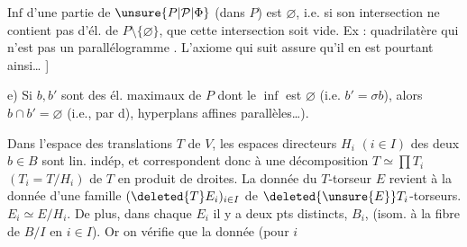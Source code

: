 $\mathrm{Inf}$ d'une partie de $\unsure{P|\mathcal P|\Phi}$ (dans $P$) est $\varnothing$, i.e. si son
intersection ne contient pas d'él. de $P\setminus\{\varnothing\}$,
que cette intersection soit vide. Ex :  quadrilatère
qui n'est pas un parallélogramme
.
L'axiome qui suit assure qu'il en est
pourtant ainsi\ldots{} ]

e) Si $b,b'$ sont des él. maximaux de $P$
 dont le $\inf$ est $\varnothing$ (i.e. $b'=\sigma b$), alors 
$b\cap b'=\varnothing$ (i.e.,  par d), 
hyperplans affines parallèles\ldots).

Dans l'espace des translations $T$ de $V$,
les  espaces directeurs $H_i$ $(i\in I)$ des
 deux   $b\in B$ sont
lin. indép, et correspondent donc à
une décomposition $\displaystyle T\simeq\prod T_i$ $(T_i=T/H_i)$
de $T$ en produit de droites. La donnée
du $T$-torseur $E$ revient à la donnée
d'une famille $(\deleted{T}E_i)_{i\in I}$ de $\deleted{\unsure{E}}T_i$-torseurs.
$E_i\simeq E/H_i$. De plus, dans chaque
$E_i$ il y a  deux pts distincts,   $B_i$,
(isom. à la fibre de $B/I$ en $i\in I$). Or
on vérifie que la donnée  (pour $i$
